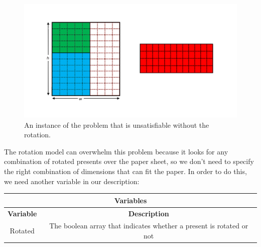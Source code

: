\begin{figure}[ht]
	\centering
	\includegraphics[width=\textwidth]{images/rotated_problem.png}
	\caption{An instance of the problem that is unsatisfiable without the rotation.}
	\label{fig:overlaps}
\end{figure}

The rotation model can overwhelm this problem because it looks for any combination of rotated presents over the paper sheet, so we don't need to specify the right combination
of dimensions that can fit the paper. In order to do this, we need another variable in our description:

\begin{center}
    \begin{adjustwidth}{-0.5cm}{}
		\begin{tabular}{|c|c|}
			\hline
			\multicolumn{2}{|c|}{\textbf{Variables}} \\
			\hline
			\textbf{Variable} & {\textbf{Description}} \\
			\hline
			Rotated & The boolean array that indicates whether a present is rotated or not \\
			\hline
		\end{tabular}
    \end{adjustwidth}
\end{center}

